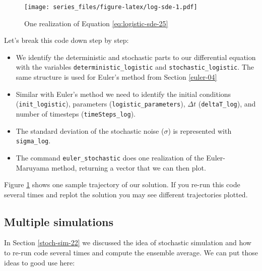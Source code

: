 \documentclass[
]{book}
\providecommand{\tightlist}{%
  \setlength{\itemsep}{0pt}\setlength{\parskip}{0pt}}
\theoremstyle{definition}
\theoremstyle{definition}
\theoremstyle{definition}
\theoremstyle{remark}
\begin{document}
\begin{figure}
\centering
\texttt{[image: series\_files/figure-latex/log-sde-1.pdf]}
\caption{\label{fig:log-sde}One realization of Equation \eqref{eq:logistic-sde-25}}
\end{figure}

Let's break this code down step by step:

\begin{itemize}
\tightlist
\item
  We identify the deterministic and stochastic parts to our differential equation with the variables \texttt{deterministic\_logistic} and \texttt{stochastic\_logistic}. The same structure is used for Euler's method from Section \ref{euler-04}
\item
  Similar with Euler's method we need to identify the initial conditions (\texttt{init\_logistic}), parameters (\texttt{logistic\_parameters}), \(\Delta t\) (\texttt{deltaT\_log}), and number of timesteps (\texttt{timeSteps\_log}).
\item
  The standard deviation of the stochastic noise (\(\sigma\)) is represented with \texttt{sigma\_log}.
\item
  The command \texttt{euler\_stochastic} does one realization of the Euler-Maruyama method, returning a vector that we can then plot.
\end{itemize}

Figure \ref{fig:log-sde} shows one sample trajectory of our solution. If you re-run this code several times and replot the solution you may see different trajectories plotted.

\hypertarget{multiple-simulations}{%
\subsection{Multiple simulations}\label{multiple-simulations}}

In Section \ref{stoch-sim-22} we discussed the idea of stochastic simulation and how to re-run code several times and compute the ensemble average. We can put those ideas to good use here:
\end{document}

